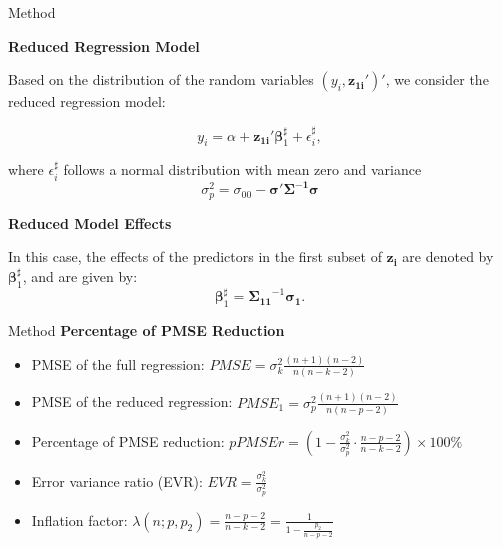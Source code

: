 \documentclass{beamer}
\begin{document}
\begin{frame}{Method}

\textbf{Reduced Regression Model}

Based on the distribution of the random variables $(y_i, \boldsymbol{z_{1i}}')'$, we consider the reduced regression model:

$$y_i = \alpha + \boldsymbol{z_{1i}}'\boldsymbol{\beta}_1^\sharp + \epsilon_i^\sharp,$$

 
where $\epsilon_i^\sharp$ follows a normal distribution with mean zero and variance 
\begin{equation}\label{eq:sigmap2}
\sigma_p^2 = \sigma_{00} - \boldsymbol{\sigma'\Sigma^{-1}\sigma}
\end{equation}

\bigskip

\textbf{Reduced Model Effects}

In this case, the effects of the predictors in the first subset of $\boldsymbol{z_i}$ are denoted by $\boldsymbol{\beta}_1^\sharp$, and are given by:
\begin{equation}
\label{eq:redu.reg.coeff}
\boldsymbol{\beta}_1^\sharp = \boldsymbol{\Sigma_{11}}^{-1}\boldsymbol{\sigma_1}.
\end{equation} 

\end{frame}

\begin{frame}{Method}
\textbf{Percentage of PMSE Reduction}
\begin{itemize}
\item PMSE of the full regression: $PMSE = \sigma_k^2 \frac{(n+1)(n-2)}{n(n-k-2)}$
\item PMSE of the reduced regression: $PMSE_1 = \sigma_p^2 \frac{(n+1)(n-2)}{n(n-p-2)}$
\item Percentage of PMSE reduction: $pPMSEr = \left(1 - \frac{\sigma_k^2}{\sigma_p^2} \cdot \frac{n-p-2}{n-k-2}\right)\times 100\%$
\item Error variance ratio (EVR): $EVR = \frac{\sigma_k^2}{\sigma_p^2}$
\item Inflation factor: $\lambda(n;p,p_2) = \frac{n-p-2}{n-k-2} = \frac{1}{1 - \frac{p_2}{n-p-2}}$
\end{itemize}
\end{frame}
\end{document}
